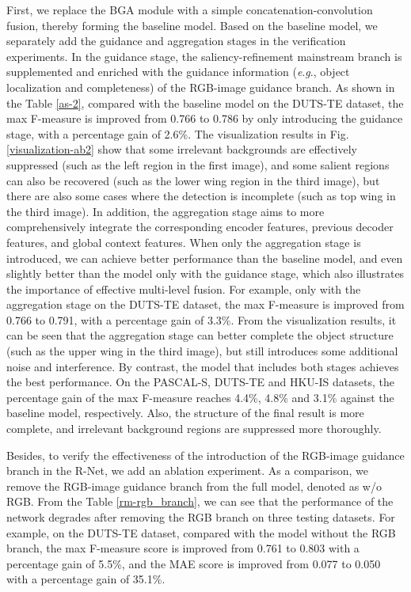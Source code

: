 \documentclass[journal]{IEEEtran}
\newcommand{\eg}{\textit{e}.\textit{g}.}
\begin{document}
First, we replace the BGA module with a simple concatenation-convolution fusion, thereby forming the baseline model.
Based on the baseline model, we separately add the guidance and aggregation stages in the verification experiments.
In the guidance stage, the saliency-refinement mainstream branch is supplemented and enriched with the guidance information (\eg, object localization and completeness) of the RGB-image guidance branch. As shown in the Table \ref{as-2}, compared with the baseline model on the DUTS-TE dataset, the max F-measure is improved from 0.766 to 0.786 by only introducing the guidance stage, with a percentage gain of 2.6\%. The visualization results in Fig. \ref{visualization-ab2} show that some irrelevant backgrounds are effectively suppressed (such as the left region in the first image), and some salient regions can also be recovered (such as the lower wing region in the third image), but there are also some cases where the detection is incomplete (such as top wing in the third image).
In addition, the aggregation stage aims to more comprehensively integrate the corresponding encoder features, previous decoder features, and global context features.
When only the aggregation stage is introduced, we can achieve better performance than the baseline model, and even slightly better than the model only with the guidance stage, which also illustrates the importance of effective multi-level fusion. For example, only with the aggregation stage on the DUTS-TE dataset, the max F-measure is improved from 0.766 to 0.791, with a percentage gain of 3.3\%. From the visualization results, it can be seen that the aggregation stage can better complete the object structure (such as the upper wing in the third image), but still introduces some additional noise and interference.
By contrast, the model that includes both stages achieves the best performance. On the PASCAL-S, DUTS-TE and HKU-IS datasets, the percentage gain of the max F-measure reaches 4.4\%, 4.8\% and 3.1\% against the baseline model, respectively.
Also, the structure of the final result is more complete, and irrelevant background regions are suppressed more thoroughly.


Besides, to verify the effectiveness of the introduction of the RGB-image guidance branch in the R-Net, we add an ablation experiment. As a comparison, we remove the RGB-image guidance branch from the full model, denoted as w/o RGB. From the Table \ref{rm-rgb_branch}, we can see that the performance of the network degrades after removing the RGB branch on three testing datasets. For example, on the DUTS-TE dataset, compared with the model without the RGB branch, the max F-measure score is improved from 0.761 to 0.803 with a percentage gain of 5.5\%, and the MAE score is improved from 0.077 to 0.050 with a percentage gain of 35.1\%.
\end{document}
